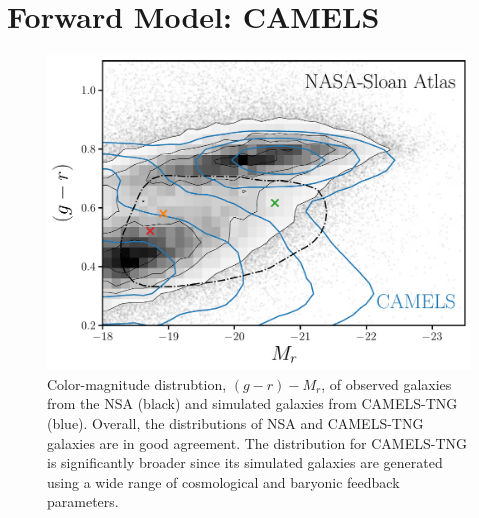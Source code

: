 \section{Forward Model: CAMELS} \label{sec:sims}
\begin{figure}[ht]
\vskip 0.2in
\begin{center}
    \centerline{\includegraphics[width=\columnwidth]{figs/nsa.pdf}}
    \caption{Color-magnitude distrubtion, $(g-r) - M_r$, of observed galaxies
    from the NSA (black) and simulated galaxies from CAMELS-TNG (blue). 
    Overall, the distributions of NSA and CAMELS-TNG galaxies are in good
    agreement. 
    The distribution for CAMELS-TNG is significantly broader since its simulated
    galaxies are generated using a wide range of cosmological and baryonic
    feedback parameters.
    }\label{fig:nsa}
\end{center}
\vskip -0.2in
\end{figure}

